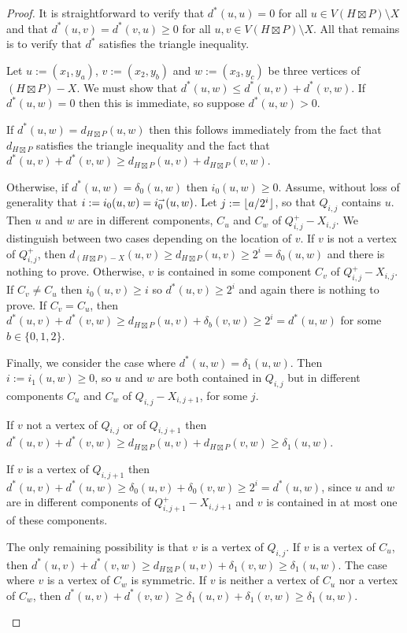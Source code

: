 \documentclass{patmorin}
\renewcommand{\ge}{\geqslant}
\renewcommand{\le}{\leqslant}
\begin{document}
\begin{proof}
  It is straightforward to verify that $d^*(u,u)=0$ for all $u\in V(H\boxtimes P)\setminus X$ and that $d^*(u,v)=d^*(v,u)\ge 0$ for all $u,v\in V(H\boxtimes P)\setminus X$.  All that remains is to verify that $d^*$ satisfies the triangle inequality.

  Let $u:=(x_1,y_a)$, $v:=(x_2,y_b)$ and $w:=(x_3,y_c)$ be three vertices of $(H\boxtimes P)- X$.  We must show that $d^*(u,w)\le d^*(u,v)+d^*(v,w)$.  If $d^*(u,w)=0$ then this is immediate, so suppose $d^*(u,w)>0$.

  If $d^*(u,w)=d_{H\boxtimes P}(u,w)$ then this follows immediately from the fact that $d_{H\boxtimes P}$ satisfies the triangle inequality and the fact that $d^*(u,v) + d^*(v,w)\ge d_{H\boxtimes P}(u,v)+d_{H\boxtimes P}(v,w)$.

  Otherwise, if $d^*(u,w)=\delta_0(u,w)$ then
  $i_0(u,w)\ge 0$. Assume, without loss of generality that $i:=i_0(u,w)=i_0^{\shortrightarrow}(u,w)$.  Let $j:={\lfloor a/2^i \rfloor}$, so that $Q_{i,j}$ contains $u$.  Then $u$ and $w$ are in different components, $C_u$ and $C_w$ of $Q^+_{i,j}-X_{i,j}$.  We distinguish between two cases depending on the location of $v$.  If $v$ is not a vertex of $Q^+_{i,j}$, then $d_{(H\boxtimes P)-X}(u,v) \ge d_{H\boxtimes P}(u,v) \ge 2^i=\delta_0(u,w)$ and there is nothing to prove.  Otherwise, $v$ is contained in some component $C_v$ of $Q^+_{i,j}-X_{i,j}$.  If $C_v\neq C_u$ then $i_0(u,v)\ge i$ so $d^*(u,v)\ge 2^i$ and again there is nothing to prove.  If $C_v=C_u$, then $d^*(u,v)+d^*(v,w)\ge d_{H\boxtimes P}(u,v)+\delta_b(v,w)\ge 2^i=d^*(u,w)$ for some $b\in\{0,1,2\}$.

  Finally, we consider the case where $d^*(u,w)=\delta_1(u,w)$. Then $i:=i_1(u,w)\ge 0$, so $u$ and $w$ are both contained in $Q_{i,j}$ but in different components $C_u$ and $C_w$ of $Q_{i,j}-X_{i,j+1}$, for some $j$.
  \begin{compactitem}
      \item If $v$ not a vertex of $Q_{i,j}$ or of $Q_{i,j+1}$ then $d^*(u,v)+d^*(v,w) \ge d_{H\boxtimes P}(u,v)+d_{H\boxtimes P}(v,w)\ge \delta_1(u,w)$.
      \item If $v$ is a vertex of $Q_{i,j+1}$ then $d^*(u,v)+d^*(u,w)\ge \delta_0(u,v)+\delta_0(v,w)\ge 2^i=d^*(u,w)$, since $u$ and $w$ are in different components of $Q^+_{i,j+1}-X_{i,j+1}$ and $v$ is contained in at most one of these components.
      \item The only remaining possibility is that $v$ is a vertex of $Q_{i,j}$. If $v$ is a vertex of $C_u$, then $d^*(u,v)+d^*(v,w)\ge d_{H\boxtimes P}(u,v)+\delta_1(v,w)\ge \delta_1(u,w)$. The case where $v$ is a vertex of $C_w$ is symmetric.  If $v$ is neither a vertex of $C_u$ nor a vertex of $C_w$, then $d^*(u,v)+d^*(v,w)\ge \delta_1(u,v) + \delta_1(v,w) \ge \delta_1(u,w)$. \qedhere
  \end{compactitem}
\end{proof}
\end{document}
